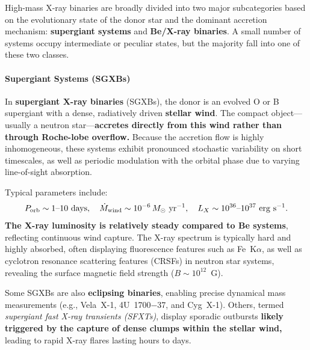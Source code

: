 High-mass X-ray binaries are broadly divided into two major subcategories based on the evolutionary state of the donor star and the dominant accretion mechanism: \textbf{supergiant systems} and \textbf{Be/X-ray binaries}. A small number of systems occupy intermediate or peculiar states, but the majority fall into one of these two classes.

\paragraph{Supergiant Systems (SGXBs)}

In \textbf{supergiant X-ray binaries} (SGXBs), the donor is an evolved O or B supergiant with a dense, radiatively driven \textbf{stellar wind}. The compact object---usually a neutron star---\textbf{accretes directly from this wind rather than through Roche-lobe overflow.} Because the accretion flow is highly inhomogeneous, these systems exhibit pronounced stochastic variability on short timescales, as well as periodic modulation with the orbital phase due to varying line-of-sight absorption.
\par
Typical parameters include:
\[
P_{\rm orb} \sim 1\text{--}10~\mathrm{days}, \quad
\dot{M}_{\rm wind} \sim 10^{-6}\,M_\odot~\mathrm{yr^{-1}}, \quad
L_X \sim 10^{36}\text{--}10^{37}~\mathrm{erg~s^{-1}}.
\]
\textbf{The X-ray luminosity is relatively steady compared to Be systems}, reflecting continuous wind capture. 
The X-ray spectrum is typically hard and highly absorbed, often displaying fluorescence features such as Fe~K$\alpha$, as well as cyclotron resonance scattering features (CRSFs) in neutron star systems, revealing the surface magnetic field strength ($B \sim 10^{12}$~G).  
\par
Some SGXBs are also \textbf{eclipsing binaries}, enabling precise dynamical mass measurements (e.g., Vela~X-1, 4U~1700$-$37, and Cyg~X-1). Others, termed \emph{supergiant fast X-ray transients (SFXTs)}, display sporadic outbursts \textbf{likely triggered by the capture of dense clumps within the stellar wind,} leading to rapid X-ray flares lasting hours to days.

